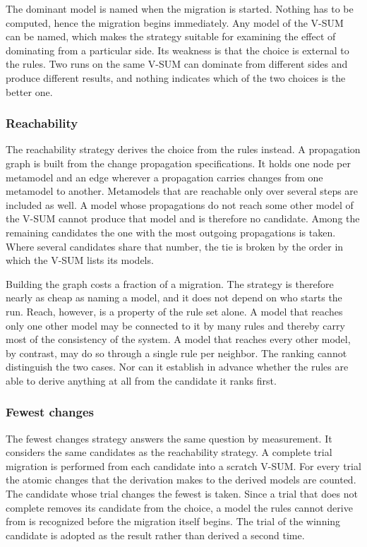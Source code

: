 The dominant model is named when the migration is started.
Nothing has to be computed, hence the migration begins immediately.
Any model of the V-SUM can be named, which makes the strategy suitable for examining the effect of dominating from a particular side.
Its weakness is that the choice is external to the rules.
Two runs on the same V-SUM can dominate from different sides and produce different results, and nothing indicates which of the two choices is the better one.

\subsubsection{Reachability}
\label{sec:Concept:Migration:FullMigration:Reachability}

The reachability strategy derives the choice from the rules instead.
A propagation graph is built from the change propagation specifications.
It holds one node per metamodel and an edge wherever a propagation carries changes from one metamodel to another.
Metamodels that are reachable only over several steps are included as well.
A model whose propagations do not reach some other model of the V-SUM cannot produce that model and is therefore no candidate.
Among the remaining candidates the one with the most outgoing propagations is taken.
Where several candidates share that number, the tie is broken by the order in which the V-SUM lists its models.

Building the graph costs a fraction of a migration.
The strategy is therefore nearly as cheap as naming a model, and it does not depend on who starts the run.
Reach, however, is a property of the rule set alone.
A model that reaches only one other model may be connected to it by many rules and thereby carry most of the consistency of the system.
A model that reaches every other model, by contrast, may do so through a single rule per neighbor.
The ranking cannot distinguish the two cases.
Nor can it establish in advance whether the rules are able to derive anything at all from the candidate it ranks first.

\subsubsection{Fewest changes}
\label{sec:Concept:Migration:FullMigration:FewestChanges}

The fewest changes strategy answers the same question by measurement.
It considers the same candidates as the reachability strategy.
A complete trial migration is performed from each candidate into a scratch V-SUM.
For every trial the atomic changes that the derivation makes to the derived models are counted.
The candidate whose trial changes the fewest is taken.
Since a trial that does not complete removes its candidate from the choice, a model the rules cannot derive from is recognized before the migration itself begins.
The trial of the winning candidate is adopted as the result rather than derived a second time.

